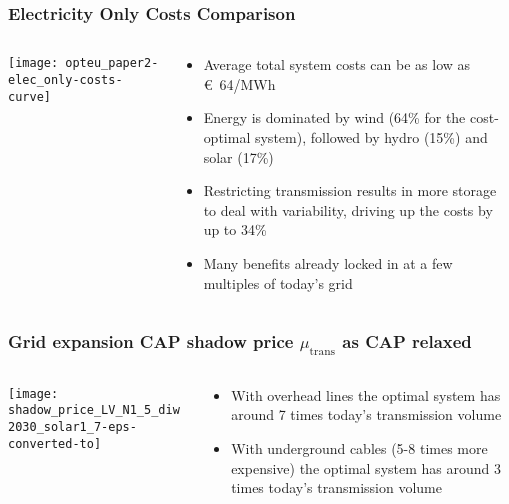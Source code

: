 \documentclass[10pt,aspectratio=169,dvipsnames]{beamer}
\def\m{\mu}
\let\olditem\item
\renewcommand{\item}{%
\olditem\vspace{5pt}}
\begin{document}
\begin{frame}
  \frametitle{Electricity Only Costs Comparison}

\begin{columns}[T]
  \begin{column}{9cm}

    \vspace{0.5cm}
  \texttt{[image: opteu\_paper2-elec\_only-costs-curve]}

  \end{column}

  \begin{column}{5cm}
    \begin{itemize}
    \item Average total system costs can be as low as \euro~64/MWh
     \item Energy is dominated by wind (64\% for the cost-optimal system), followed
       by hydro (15\%) and solar (17\%)
     \item Restricting transmission results in more storage to deal with variability, driving up the costs by up to 34\%
     \item Many benefits already locked in at a few multiples of today's grid
    \end{itemize}

  \end{column}

\end{columns}
\end{frame}


\begin{frame}
  \frametitle{Grid expansion CAP shadow price $\m_{\textrm{trans}}$ as CAP relaxed}


\begin{columns}[T]
\begin{column}{9cm}
\centering
  \texttt{[image: shadow\_price\_LV\_N1\_5\_diw2030\_solar1\_7-eps-converted-to]}
\end{column}
\begin{column}{4cm}
  \begin{itemize}
  \item With overhead lines the optimal system has around 7 times today's transmission volume
  \item With underground cables (5-8 times more expensive) the optimal system has around 3 times today's transmission volume
  \end{itemize}
\end{column}
\end{columns}

\end{frame}
\end{document}
